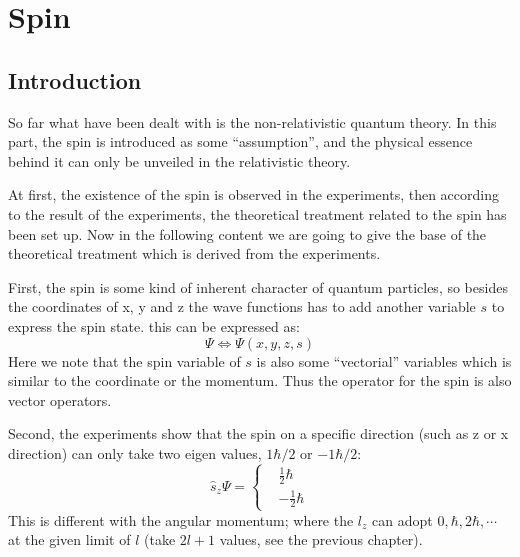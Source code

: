 %
%


\chapter{Spin}
%
%
%
%
\section{Introduction}
%
%
%
So far what have been dealt with is the non-relativistic quantum
theory. In this part, the spin is introduced as some ``assumption'',
and the physical essence behind it can only be unveiled in the
relativistic theory.

At first, the existence of the spin is observed in the experiments,
then according to the result of the experiments, the theoretical
treatment related to the spin has been set up. Now in the following
content we are going to give the base of the theoretical treatment
which is derived from the experiments.

First, the spin is some kind of inherent character of quantum
particles, so besides the coordinates of x, y and z the wave
functions has to add another variable $s$ to express the spin state.
this can be expressed as:
\begin{equation}\label{}
\Psi \Leftrightarrow \Psi (x,y,z,s)
\end{equation}
Here we note that the spin variable of $s$ is also some
``vectorial'' variables which is similar to the coordinate or the
momentum. Thus the operator for the spin is also vector operators.

Second, the experiments show that the spin on a specific direction
(such as z or x direction) can only take two eigen values,
$1\hbar/2$ or $-1\hbar/2$:
\begin{equation} \label{SPINeq:1}
\hat{s}_{z}\Psi = \left\{ \begin{aligned}
           & \frac{1}{2}\hbar \\
           & -\frac{1}{2}\hbar
           \end{aligned} \right.
\end{equation}
This is different with the angular momentum; where the $l_{z}$ can
adopt $0, \hbar, 2\hbar, \cdots$ at the given limit of $l$ (take
$2l+1$ values, see the previous chapter).

